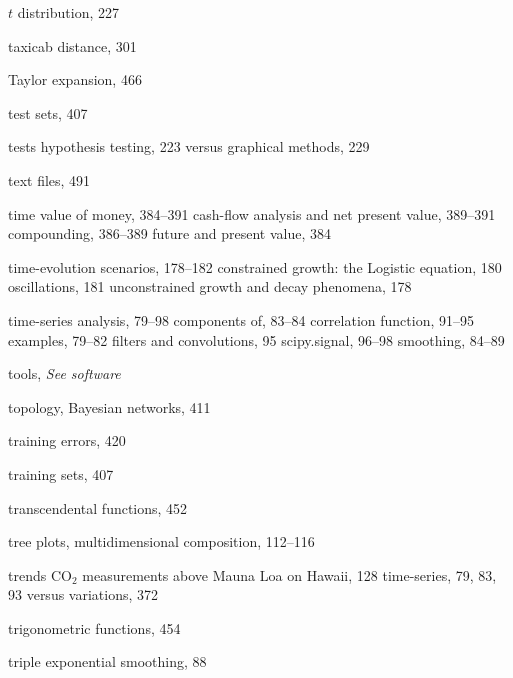 \documentclass{Oreilly5980006}
\def\see#1{{\it See software}}
\begin{document}
\begin{theindex}
  \item $t$ distribution, 227
  \item taxicab distance, 301
  \item Taylor expansion, 466
  \item test sets, 407
  \item tests
    \subitem hypothesis testing, 223
    \subitem versus graphical methods, 229
  \item text files, 491
  \item time value of money, 384--391
    \subitem cash-flow analysis and net present value, 389--391
    \subitem compounding, 386--389
    \subitem future and present value, 384
  \item time-evolution scenarios, 178--182
    \subitem constrained growth: the Logistic equation, 180
    \subitem oscillations, 181
    \subitem unconstrained growth and decay phenomena, 178
  \item time-series analysis, 79--98
    \subitem components of, 83--84
    \subitem correlation function, 91--95
    \subitem examples, 79--82
    \subitem filters and convolutions, 95
    \subitem scipy.signal, 96--98
    \subitem smoothing, 84--89
  \item tools, \see{software} %



  \item topology, Bayesian networks, 411
  \item training errors, 420
  \item training sets, 407
  \item transcendental functions, 452
  \item tree plots, multidimensional composition, 112--116
  \item trends
    \subitem $\mathrm{CO_2}$ measurements above Mauna Loa on Hawaii, 
		128
    \subitem time-series, 79, 83, 93
    \subitem versus variations, 372
  \item trigonometric functions, 454
  \item triple exponential smoothing, 88

  \indexspace


\end{theindex}
\end{document}
